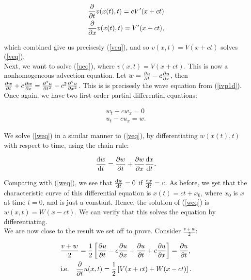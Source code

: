 \documentclass[a4paper, 12pt]{article}
\numberwithin{equation}{section}
\begin{document}
\begin{equation*}
    \begin{aligned}
    \diffp[1]{}{t}v(x(t), t)=cV'(x+ct)\\
    \diffp[1]{}{x}v(x(t), t)=V'(x+ct),
    \end{aligned}
\end{equation*}

which combined give us precisesly (\ref{veq}), and so $v(x,t)=V(x+ct)$ solves
(\ref{veq}). \\

Next, we want to solve (\ref{ueq}), where $v(x,t)=V(x+ct)$. This is now a
nonhomogeneous advection equation. Let $w=\diffp[1]{u}{t}-c\diffp{u}{x}$, then
$\diffp[1]{w}{t}+c\diffp{w}{x}=\diffp[2]{u}{t}-c^2\diffp[2]{u}{x}$. This is is
precisesly the wave equation from (\ref{ivp1d}). Once again, we have two first
order partial differential equations:

\begin{align}
    \label{weq}
    w_t+cw_x=0\\
    \label{ueqw}
    u_t-cu_x=w.
\end{align}

We solve (\ref{weq}) in a similar manner to (\ref{veq}), by differentiating
$w(x(t),t)$ with respect to time, using the chain rule:

\begin{equation} \label{diffw}
    \diff{w}{t}=\diffp[1]{w}{t}+\diffp[1]{w}{x}\diff{x}{t}. 
\end{equation}

Comparing with (\ref{weq}), we see that $\diff{w}{t}=0$ if $\diff{x}{t}=c$. As
before, we get that the characteristic curve of this differential equation is
$x(t)=ct+x_0$, where $x_0$ is $x$ at time $t=0$, and is just a constant. Hence,
the solution of (\ref{weq}) is $w(x,t)=W(x-ct)$. We can verify that this solves
the equation by differentiating. \\

We are now close to the result we set off to prove. Consider $\frac{v+w}{2}$:

\begin{equation*}
    \begin{aligned}
    &\frac{v+w}{2}=\frac{1}{2}\left[\diffp[1]{u}{t}-c\diffp[1]{u}{x}+\diffp[1]{u}{t}+c\diffp[1]{u}{x}\right]=\diffp[1]{u}{t},\\
    &\textrm{i.e.} \quad \diffp[1]{}{t}u(x, t)=\frac{1}{2}\left[V(x+ct)+W(x-ct)\right].
    \end{aligned}
\end{equation*}
\end{document}
